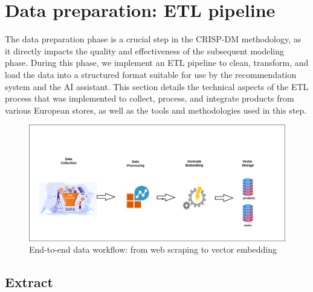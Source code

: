 \section{Data preparation: ETL pipeline}


The data preparation phase is a crucial step in the CRISP-DM methodology, as it directly impacts the quality and effectiveness of the subsequent
modeling phase. During this phase, we implement an ETL pipeline to
clean, transform, and load the data into a structured format suitable for
use by the recommendation system and the AI assistant. This section
details the technical aspects of the ETL process that was implemented
to collect, process, and integrate products from various European stores,
as well as the tools and methodologies used in this step.

\begin{center}
\begin{figure}[H]
    \includegraphics[scale=0.35]{images/workflow__data.png}
    \caption{End-to-end data workflow: from web scraping to vector embedding}
    \label{fig:data_workflow}
\end{figure}
\end{center}

\subsection{Extract}

